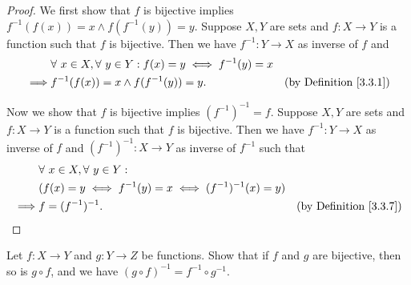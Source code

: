 \begin{proof}
We first show that \(f\) is bijective implies \(f^{-1}(f(x)) = x \land f(f^{-1}(y)) = y\).
Suppose \(X, Y\) are sets and \(f : X \to Y\) is a function such that \(f\) is bijective.
Then we have \(f^{-1} : Y \to X\) as inverse of \(f\) and
\begin{align*}
& \forall\ x \in X, \forall\ y \in Y : f(x) = y \iff f^{-1}(y) = x \\
\implies & f^{-1}(f(x)) = x \land f(f^{-1}(y)) = y. & \text{(by Definition \ref{3.3.1})}
\end{align*}

Now we show that \(f\) is bijective implies \((f^{-1})^{-1} = f\).
Suppose \(X, Y\) are sets and \(f : X \to Y\) is a function such that \(f\) is bijective.
Then we have \(f^{-1} : Y \to X\) as inverse of \(f\) and \((f^{-1})^{-1} : X \to Y\) as inverse of \(f^{-1}\) such that
\begin{align*}
& \forall\ x \in X, \forall\ y \in Y : \\
& (f(x) = y \iff f^{-1}(y) = x \iff (f^{-1})^{-1}(x) = y) \\
\implies & f = (f^{-1})^{-1}. & \text{(by Definition \ref{3.3.7})}
\end{align*}
\end{proof}

\begin{exercise}\label{ex 3.3.7}
Let \(f : X \to Y\) and \(g : Y \to Z\) be functions.
Show that if \(f\) and \(g\) are bijective, then so is \(g \circ f\), and we have \((g \circ f)^{-1} = f^{-1} \circ g^{-1}\).
\end{exercise}

